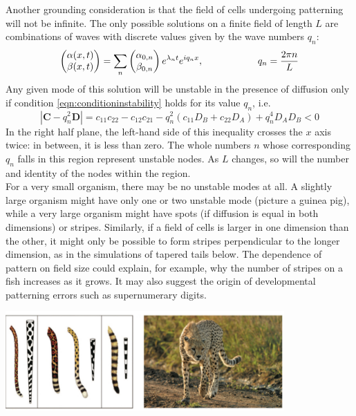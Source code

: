 \documentclass{article}
\begin{document}
Another grounding consideration is that the field of cells undergoing patterning will not be infinite. The only possible solutions on a finite field of length $L$ are combinations of waves with discrete values given by the wave numbers $q_n$:
\[ \begin{pmatrix} \alpha(x,t) \\ \beta(x,t) \end{pmatrix} = \sum_n  \begin{pmatrix} \alpha_{0,n} \\ \beta_{0,n} \end{pmatrix} e^{\lambda_n t} e^{iq_n x}, \hspace{2 cm} q_n = \frac{2 \pi n}{L}  \]
Any given mode of this solution will be unstable in the presence of diffusion only if condition \ref{eqn:conditioninstability} holds for its value $q_n$, i.e.
\[ \left| \mathbf{C} - q_n^2 \mathbf{D} \right| = c_{11}c_{22} - c_{12} c_{21}  - q_n^2 \left( c_{11} D_B + c_{22} D_A \right) + q_n^4 D_A D_B < 0 \]
In the right half plane, the left-hand side of this inequality crosses the $x$ axis twice: in between, it is less than zero. The whole numbers $n$ whose corresponding $q_n$ falls in this region represent unstable nodes. As $L$ changes, so will the number and identity of the nodes within the region.\\

For a very small organism, there may be no unstable modes at all. A slightly large organism might have only one or two unstable mode (picture a guinea pig), while a very large organism might have spots (if diffusion is equal in both dimensions) or stripes. Similarly, if a field of cells is larger in one dimension than the other, it might only be possible to form stripes perpendicular to the longer dimension, as in the simulations of tapered tails below. The dependence of pattern on field size could explain, for example, why the number of stripes on a fish increases as it grows. It may also suggest the origin of developmental patterning errors such as supernumerary digits.

\begin{center}
\includegraphics[width=0.8\textwidth]{tail.pdf}
\end{center}
\end{document}
